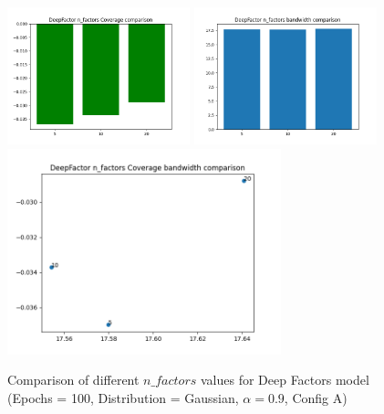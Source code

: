 \documentclass[a4paper, 12pt]{article}
\begin{document}
\begin{figure}[!h]
    \centering
    \includegraphics[width=200px]{plots/hist/a/DeepFactor/n_factors/Coverage.png}
    \includegraphics[width=200px]{plots/hist/a/DeepFactor/n_factors/bandwidth.png}
    \includegraphics[width=300px]{plots/scatter/a/DeepFactor/n_factors/Coverage_bandwidth.png}
    \caption{Comparison of different $n\_factors$ values for Deep Factors model (Epochs = 100, Distribution = Gaussian, $\alpha = 0.9$, Config A)}
    \label{fig:comp_deepfactor_n_factors}
\end{figure}
\end{document}
